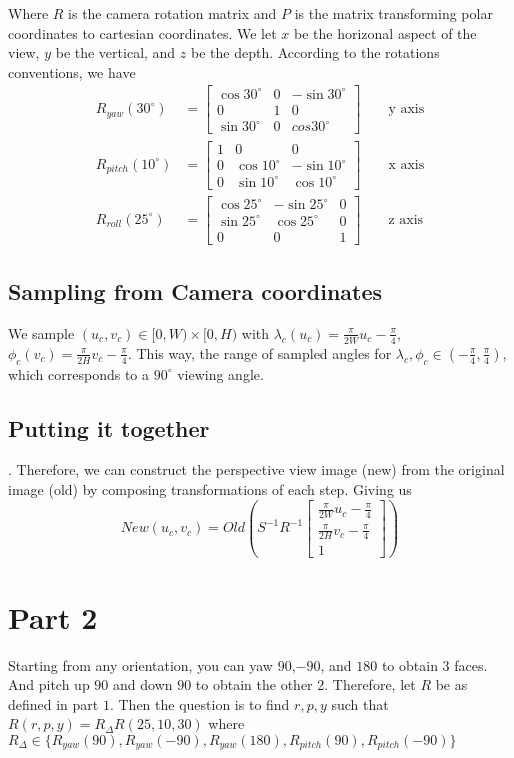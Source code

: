 \documentclass{article}
\begin{document}
Where $R$ is the camera rotation matrix and $P$ is the matrix transforming polar coordinates to cartesian coordinates. 
We let $x$ be the horizonal aspect of the view, $y$ be the vertical, and $z$ be the depth. 
According to the rotations conventions, we have 
\begin{align*}
    R_{yaw}(30^\circ) &= \begin{bmatrix}
        \cos 30^\circ & 0 & -\sin 30^\circ \\
        0 & 1 & 0 \\
        \sin 30^\circ & 0 & cos 30^\circ
    \end{bmatrix} && \text{ y axis} \\
    R_{pitch}(10^\circ) &= \begin{bmatrix}
        1 & 0 & 0 \\
        0 & \cos 10^\circ & -\sin 10^\circ \\
        0 & \sin 10^\circ & \cos 10^\circ
    \end{bmatrix} && \text{ x axis} \\ 
    R_{roll}(25^\circ) &= \begin{bmatrix}
        \cos 25^\circ & -\sin 25^\circ & 0 \\
        \sin 25^\circ & \cos 25^\circ & 0 \\
        0 & 0 & 1
    \end{bmatrix} && \text{ z axis}
\end{align*}

\subsection{Sampling from Camera coordinates}
We sample $(u_c, v_c) \in [0, W) \times [0, H)$ with 
$\lambda_c(u_c) = \frac{\pi}{2W}u_c - \frac{\pi}{4}$, $\phi_c(v_c) = \frac{\pi}{2H}v_c - \frac{\pi}{4}$. 
This way, the range of sampled angles for $\lambda_c, \phi_c \in (-\frac{\pi}{4}, \frac{\pi}{4})$, which corresponds to a $90^\circ$ viewing angle. 

\subsection{Putting it together}. 
Therefore, we can construct the perspective view image (new) from the original image (old) by composing transformations of each step. 
Giving us 
\[
New(u_c, v_c) = Old(
S^{-1}
R^{-1}
\begin{bmatrix}
    \frac{\pi}{2W}u_c - \frac{\pi}{4} \\ 
    \frac{\pi}{2H}v_c - \frac{\pi}{4} \\ 
    1
\end{bmatrix}
)
\] 

\section{Part 2}
Starting from any orientation, you can yaw $90$,$ -90$, and $180$ to obtain $3$ faces. And pitch up $90$ and down $90$ to obtain the other $2$. 
Therefore, let $R$ be as defined in part $1$. Then the question is to find $r, p, y$ such that 
$R(r, p, y) = R_\Delta R(25, 10, 30)$
where $R_\Delta \in \{R_{yaw}(90), R_{yaw}(-90), R_{yaw}(180), R_{pitch}(90), R_{pitch}(-90)\}$
\end{document}
